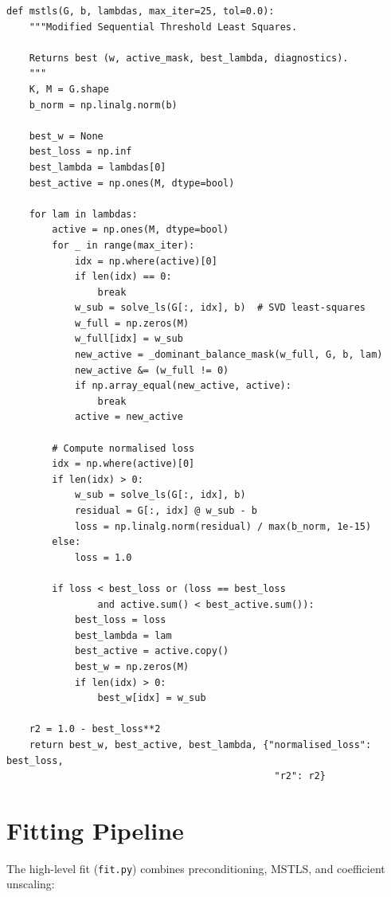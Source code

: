 \documentclass[11pt]{article}
\begin{document}
\begin{lstlisting}[caption={regression.py --- MSTLS main loop}]
def mstls(G, b, lambdas, max_iter=25, tol=0.0):
    """Modified Sequential Threshold Least Squares.

    Returns best (w, active_mask, best_lambda, diagnostics).
    """
    K, M = G.shape
    b_norm = np.linalg.norm(b)

    best_w = None
    best_loss = np.inf
    best_lambda = lambdas[0]
    best_active = np.ones(M, dtype=bool)

    for lam in lambdas:
        active = np.ones(M, dtype=bool)
        for _ in range(max_iter):
            idx = np.where(active)[0]
            if len(idx) == 0:
                break
            w_sub = solve_ls(G[:, idx], b)  # SVD least-squares
            w_full = np.zeros(M)
            w_full[idx] = w_sub
            new_active = _dominant_balance_mask(w_full, G, b, lam)
            new_active &= (w_full != 0)
            if np.array_equal(new_active, active):
                break
            active = new_active

        # Compute normalised loss
        idx = np.where(active)[0]
        if len(idx) > 0:
            w_sub = solve_ls(G[:, idx], b)
            residual = G[:, idx] @ w_sub - b
            loss = np.linalg.norm(residual) / max(b_norm, 1e-15)
        else:
            loss = 1.0

        if loss < best_loss or (loss == best_loss
                and active.sum() < best_active.sum()):
            best_loss = loss
            best_lambda = lam
            best_active = active.copy()
            best_w = np.zeros(M)
            if len(idx) > 0:
                best_w[idx] = w_sub

    r2 = 1.0 - best_loss**2
    return best_w, best_active, best_lambda, {"normalised_loss": best_loss,
                                               "r2": r2}
\end{lstlisting}


\section{Fitting Pipeline}
\label{sec:fit}

The high-level fit (\texttt{fit.py}) combines preconditioning, MSTLS,
and coefficient unscaling:
\end{document}
